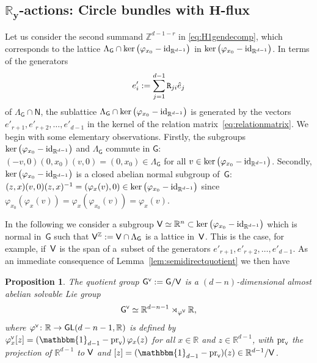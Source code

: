 \documentclass[pdftex]{sigma}
\numberwithin{equation}{section}
\newcommand{\Z}{\zed}
\def\Id{{\rm id}}
\def\V{{\sf V}}
\newcommand{\unit}{\mathbbm{1}} 			%
\newcommand{\sfG}{\mathsf{G}}
\newcommand{\sfN}{\mathsf{N}}
\newcommand{\sfGL}{\mathsf{GL}}
\newcommand{\R}{\real}
\newcommand{\zed}{{\mathbb Z}} %
\newcommand{\real}{{\mathbb R}} %
\newtheorem{Proposition}[Theorem]{Proposition}
 { \theoremstyle{definition}
\newtheorem{Definition}[Theorem]{Definition}
\newtheorem{Note}[Theorem]{Note}
\newtheorem{Example}[Theorem]{Example}
\newtheorem{Remark}[Theorem]{Remark} }
\begin{document}
\subsection[$\real_y$-actions: Circle bundles with $H$-flux]{$\boldsymbol{\real_y}$-actions: Circle bundles with $\boldsymbol{H}$-flux}\label{sec:Rygen}

Let us consider the second summand $\Z^{d-1-r}$ in
\eqref{eq:H1gendecomp}, which corresponds to the lattice $\Lambda_\sfG\cap
\ker\big(\varphi_{x_0}-{\rm id}_{\R^{d-1}}\big)$ in $\ker\big(\varphi_{x_0}-\Id_{\R^{d-1}}\big)$.
In terms of the generators
\[
e'_i:=\sum_{j=1}^{d-1} {\tt R}_{ji} \hat e_j
\]
of
$\Lambda_\sfG\cap \sfN$, the sublattice $\Lambda_\sfG\cap
\ker\big(\varphi_{x_0}-\Id_{\R^{d-1}}\big)$ is generated by the
vectors $e'_{r+1},e'_{r+2},\ldots,e'_{d-1}$ in the kernel of the
relation matrix~\eqref{eq:relationmatrix}. We
 begin with some
elementary observations. Firstly, the subgroups $\ker\big(\varphi_{x_0}-\Id_{\R^{d-1}}\big)$ and
$\Lambda_\sfG$ commute in $\sfG$:
$(-v,0) (0,x_0) (v,0)=(0,x_0)\in \Lambda_\sfG$ for all $v\in \ker\big(\varphi_{x_0}-\Id_{\R^{d-1}}\big)$.
Secondly, $\ker\big(\varphi_{x_0}-\Id_{\R^{d-1}}\big)$ is a closed abelian
normal subgroup of~$\sfG$:
$(z,x) (v,0) (z,x)^{-1}=(\varphi_x(v),0)\in
\ker\big(\varphi_{x_0}-\Id_{\R^{d-1}}\big)$ since
$\varphi_{x_0}(\varphi_x(v))=\varphi_{x}(\varphi_{x_0}(v))=\varphi_x(v)$.

In the following we consider a subgroup $\V\simeq\real^n\subset
\ker\big(\varphi_{x_0}-\Id_{\R^{d-1}}\big)$ which is normal in~$\sfG$
such that $\V^\zed:=\V\cap\Lambda_\sfG$ is a lattice in~$\V$.
This is the case, for example, if~$\V$ is the span of a~subset of the generators
 $e'_{r+1},e'_{r+2},\ldots, e'_{d-1}$. As an immediate consequence of
 Lemma~\ref{lem:semidirectquotient} we then have

\begin{Proposition}\label{lem:quotientgroup}
The quotient group $\sfG^{\text{\tiny$\V$}}:=\sfG/\V$ is a $(d{-}n)$-dimensional almost
abelian solvable Lie group
$$
\sfG^{\text{\tiny$\V$}}\simeq\R^{d-n-1}
\rtimes_{\varphi^{\text{\tiny$\V$}}}\R ,
$$
where $\varphi^{\text{\tiny{$\V$}}}\colon \R\to\sfGL(d-n-1,\R)$ is
defined by $\varphi^{\text{\tiny{$\V$}}}_x[z]
=(\unit_{d-1}-{\rm pr}_{\text{\tiny{$\V$}}})\,\varphi_x(z)$ for
all $x\in\R$ and $z\in \real^{d-1}$, with ${\rm pr}_{\text{\tiny{$\V$}}}$ the projection
of $\R^{d-1}$ to $\V$ and $[z]=(\unit_{d-1}-{\rm
 pr}_{\text{\tiny{$\V$}}})(z)\in \real^{d-1}/\V$.
\end{Proposition}
\end{document}
